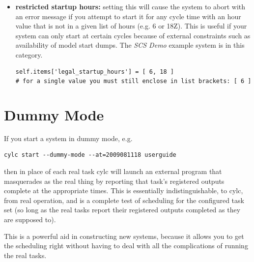 \documentclass[11pt,a4paper]{article}
\begin{document}
\begin{itemize}
    \item {\bf restricted startup hours:} setting this will cause 
        the system to abort with an error message if you attempt to
        start it for any cycle time with an hour value that is not in a given
        list of hours (e.g. 6 or 18Z). This is useful if your system 
        can only start at certain cycles because of external constraints
        such as availability of model start dumps. The {\em SCS Demo}
        example system is in this category.

    \begin{lstlisting}
self.items['legal_startup_hours'] = [ 6, 18 ]
# for a single value you must still enclose in list brackets: [ 6 ] 
    \end{lstlisting}

\end{itemize}


\pagebreak

%
%
%

\lstset{language=}

\section{Dummy Mode} 
\label{DummyMode}

If you start a system in dummy mode, e.g.\:

\begin{lstlisting}
cylc start --dummy-mode --at=2009081118 userguide
\end{lstlisting}

then in place of each real task cylc will launch an external program
that masquerades as the real thing by reporting that task's registered
outputs complete at the appropriate times. This is essentially
indistinguishable, to cylc, from real operation, and is a complete test
of scheduling for the configured task set (so long as the real tasks
report their registered outputs completed as they are supposed to). 

This is a powerful aid in constructing new systems, because it allows
you to get the scheduling right without having to deal with all the
complications of running the real tasks.
\end{document}
